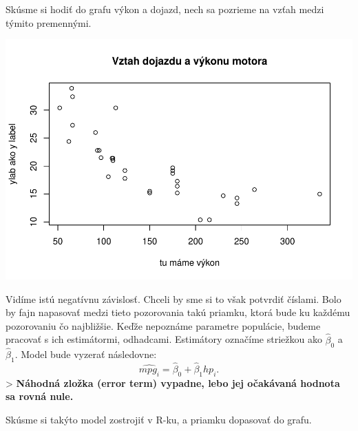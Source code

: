 Skúsme si hodiť do grafu výkon a dojazd, nech sa pozrieme na vzťah medzi
týmito premennými.

\begin{Shaded}
\begin{Highlighting}[]

\NormalTok{(}\OperatorTok{$}\OperatorTok{$} \NormalTok{, }
       
\end{Highlighting}
\end{Shaded}

\includegraphics{test_files/figure-latex/unnamed-chunk-39-1.pdf}

Vidíme istú negatívnu závislosť. Chceli by sme si to však potvrdiť
číslami. Bolo by fajn napasovať medzi tieto pozorovania takú priamku,
ktorá bude ku každému pozorovaniu čo najbližšie. Keďže nepoznáme
parametre populácie, budeme pracovať s ich estimátormi, odhadcami.
Estimátory označíme striežkou ako \(\hat\beta_0{}\) a \(\hat\beta_1{}\).
Model bude vyzerať následovne:
\[\hat{mpg_i} = \hat\beta_0 + \hat \beta_1{hp_i}.\] \textgreater{}
\textbf{Náhodná zložka (error term) vypadne, lebo jej očakávaná hodnota
sa rovná nule.}

Skúsme si takýto model zostrojiť v R-ku, a priamku dopasovať do grafu.

